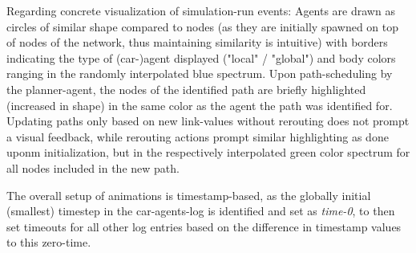 Regarding concrete visualization of simulation-run events:
Agents are drawn as circles of similar shape compared to nodes (as they are initially spawned on top of nodes of the network, thus maintaining similarity is intuitive) with borders indicating the type of (car-)agent displayed ("local" / "global") and body colors ranging in the randomly interpolated blue spectrum.
Upon path-scheduling by the planner-agent, the nodes of the identified path are briefly highlighted (increased in shape) in the same color as the agent the path was identified for. Updating paths only based on new link-values without rerouting does not prompt a visual feedback, while rerouting actions prompt similar highlighting as done uponm initialization, but in the respectively interpolated green color spectrum for all nodes included in the new path.

The overall setup of animations is timestamp-based, as the globally initial (smallest) timestep in the car-agents-log is identified and set as \textit{time-0}, to then set timeouts for all other log entries based on the difference in timestamp values to this zero-time.
